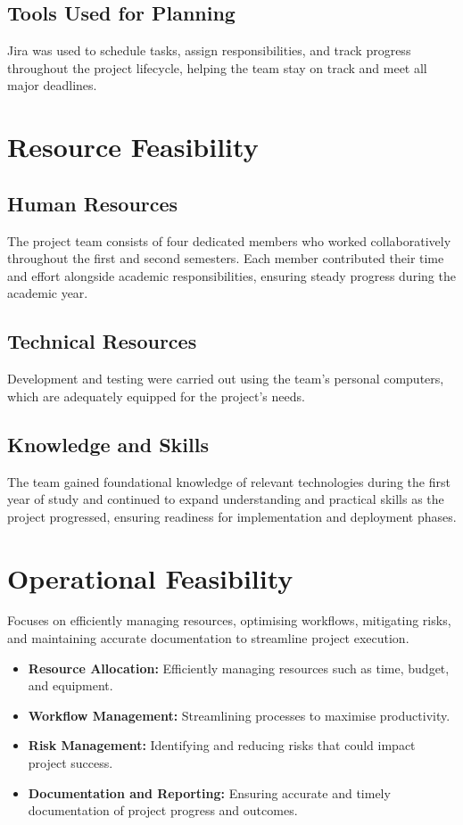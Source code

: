 \documentclass[12pt, a4paper]{report}
\begin{document}
\subsection{Tools Used for Planning}
Jira was used to schedule tasks, assign responsibilities, and track progress throughout the project lifecycle, helping the team stay on track and meet all major deadlines.

\section{Resource Feasibility}

\subsection{Human Resources}
The project team consists of four dedicated members who worked collaboratively throughout the first and second semesters. Each member contributed their time and effort alongside academic responsibilities, ensuring steady progress during the academic year.

\subsection{Technical Resources}
Development and testing were carried out using the team's personal computers, which are adequately equipped for the project's needs.

\subsection{Knowledge and Skills}
The team gained foundational knowledge of relevant technologies during the first year of study and continued to expand understanding and practical skills as the project progressed, ensuring readiness for implementation and deployment phases.

\section{Operational Feasibility}

Focuses on efficiently managing resources, optimising workflows, mitigating risks, and maintaining accurate documentation to streamline project execution.

\begin{itemize}
    \item \textbf{Resource Allocation:} Efficiently managing resources such as time, budget, and equipment.
    \item \textbf{Workflow Management:} Streamlining processes to maximise productivity.
    \item \textbf{Risk Management:} Identifying and reducing risks that could impact project success.
    \item \textbf{Documentation and Reporting:} Ensuring accurate and timely documentation of project progress and outcomes.
\end{itemize}
\end{document}
